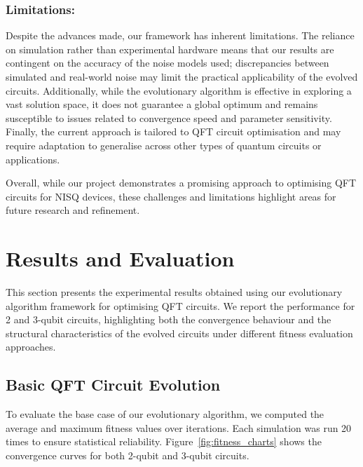 \documentclass[11pt,a4paper]{article}
\begin{document}
\subsubsection*{Limitations:}  
Despite the advances made, our framework has inherent limitations. The reliance on simulation rather than experimental hardware means that our results are contingent on the accuracy of the noise models used; discrepancies between simulated and real-world noise may limit the practical applicability of the evolved circuits. Additionally, while the evolutionary algorithm is effective in exploring a vast solution space, it does not guarantee a global optimum and remains susceptible to issues related to convergence speed and parameter sensitivity. Finally, the current approach is tailored to QFT circuit optimisation and may require adaptation to generalise across other types of quantum circuits or applications.\newline

Overall, while our project demonstrates a promising approach to optimising QFT circuits for NISQ devices, these challenges and limitations highlight areas for future research and refinement.


%
%
\section{Results and Evaluation}

This section presents the experimental results obtained using our evolutionary algorithm framework for optimising QFT circuits. We report the performance for 2 and 3-qubit circuits, highlighting both the convergence behaviour and the structural characteristics of the evolved circuits under different fitness evaluation approaches.

\subsection{Basic QFT Circuit Evolution}
To evaluate the base case of our evolutionary algorithm, we computed the average and maximum fitness values over iterations. Each simulation was run 20 times to ensure statistical reliability. Figure~\ref{fig:fitness_charts} shows the convergence curves for both 2-qubit and 3-qubit circuits.
\end{document}
